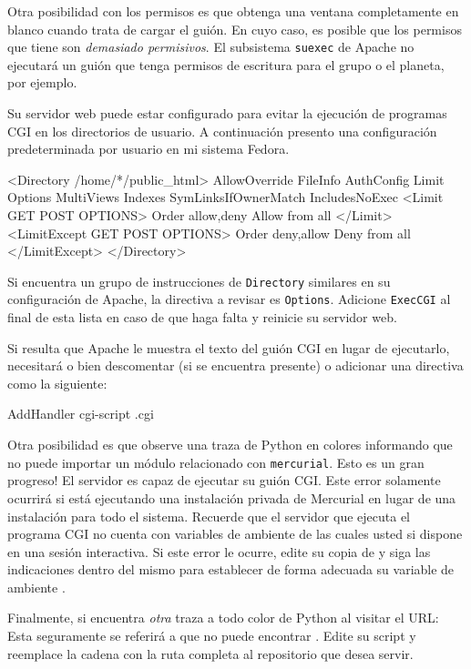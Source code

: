 Otra posibilidad con los permisos es que obtenga una ventana
completamente en blanco cuando trata de cargar el guión. En cuyo
caso, es posible que los permisos que tiene son \emph{demasiado
 permisivos}.  El subsistema \texttt{suexec} de Apache no ejecutará un
guión que tenga permisos de escritura para el grupo o el planeta, por
ejemplo.

Su servidor web puede estar configurado para evitar la ejecución de
programas CGI en los directorios de usuario.  A continuación presento
una configuración predeterminada por usuario en mi sistema Fedora.

\begin{codesample2}
  <Directory /home/*/public_html>
      AllowOverride FileInfo AuthConfig Limit
      Options MultiViews Indexes SymLinksIfOwnerMatch IncludesNoExec
      <Limit GET POST OPTIONS>
          Order allow,deny
          Allow from all
      </Limit>
      <LimitExcept GET POST OPTIONS>
          Order deny,allow
          Deny from all
      </LimitExcept>
  </Directory>
\end{codesample2}
Si encuentra un grupo de instrucciones de \texttt{Directory} similares
en su configuración de Apache,  la directiva a revisar es \texttt{Options}.
Adicione \texttt{ExecCGI} al final de esta lista en caso de que haga
falta y reinicie su servidor web.

Si resulta que Apache le muestra el texto del guión CGI en lugar de
ejecutarlo, necesitará o bien descomentar (si se encuentra presente) o
adicionar una directiva como la siguiente:
\begin{codesample2}
  AddHandler cgi-script .cgi
\end{codesample2}

Otra posibilidad es que observe una traza de Python en colores
informando que no puede importar un módulo relacionado con
\texttt{mercurial}.  Esto es un gran progreso!  El servidor es capaz
de ejecutar su guión CGI.  Este error solamente ocurrirá si está
ejecutando una instalación privada de Mercurial en lugar de una
instalación para todo el sistema.  Recuerde que el servidor que
ejecuta el programa CGI no cuenta con variables de ambiente de las
cuales usted si dispone en una sesión interactiva.  Si este error le
ocurre, edite su copia de  y siga las indicaciones
dentro del mismo para establecer de forma adecuada su variable de
ambiente .

Finalmente, si encuentra \emph{otra} traza a todo color de Python al visitar
el URL: Esta seguramente se referirá a que no puede encontrar
.  Edite su script 
y reemplace la cadena  con la ruta
completa al repositorio que desea servir.

